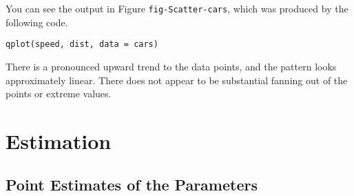 You can see the output in Figure \texttt{fig-Scatter-cars}, which was produced by the
following code.

\begin{verbatim}
qplot(speed, dist, data = cars)
\end{verbatim}

There is a pronounced upward trend to the data points, and the pattern
looks approximately linear. There does not appear to be substantial
fanning out of the points or extreme values.

\section{Estimation}
\label{sec-11-2}

\subsection{Point Estimates of the Parameters}
\label{sec-11-2-1}

